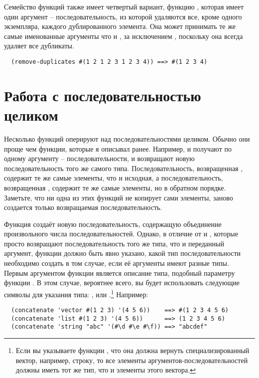 Семейство функций  также имеет четвертый вариант, функцию
, которая имеет один аргумент -- последовательность, из которой
удаляются все, кроме одного экземпляра, каждого дублированного элемента.  Она может
принимать те же самые именованные аргументы что и , за исключением
, поскольку она всегда удаляет все дубликаты.

\begin{verbatim}
  (remove-duplicates #(1 2 1 2 3 1 2 3 4)) ==> #(1 2 3 4)
\end{verbatim}

\section{Работа с последовательностью целиком}

Несколько функций оперируют над последовательностями целиком.  Обычно
они проще чем функции, которые я описывал ранее.  Например,
 и  получают по одному аргументу -- последовательности, и
возвращают новую последовательность того же самого типа.  Последовательность, возвращенная
, содержит те же самые элементы, что и исходная,
а последовательность, возвращенная , содержит те же
самые элементы, но в обратном порядке.  Заметьте, что ни одна из этих функций не копирует
сами элементы, заново создается только возвращаемая последовательность.

Функция  создаёт новую последовательность, содержащую объединение произвольного
числа последовательностей.  Однако, в отличие от  и , которые
просто возвращают последовательность того же типа, что и переданный аргумент, функции
 должно быть явно указано, какой тип последовательности необходимо
создать в том случае, если её аргументы имеют разные типы.  Первым аргументом функции
является описание типа, подобный параметру  функции .
В этом случае, вероятнее всего, вы будет использовать следующие символы для указания типа:
,  или .\footnote{Если вы указываете функции
  , что она должна вернуть специализированный вектор, например, строку,
  то все элементы аргументов-последовательностей должны иметь тот же тип, что и элементы
  этого вектора.}  Например:

\begin{verbatim}
  (concatenate 'vector #(1 2 3) '(4 5 6))    ==> #(1 2 3 4 5 6)
  (concatenate 'list #(1 2 3) '(4 5 6))      ==> (1 2 3 4 5 6)
  (concatenate 'string "abc" '(#\d #\e #\f)) ==> "abcdef"
\end{verbatim}

